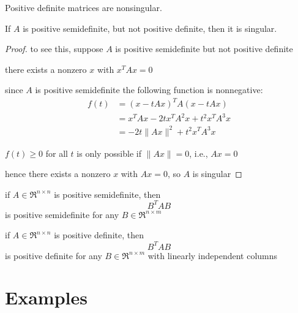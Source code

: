 \begin{theorem}
    Positive definite matrices are nonsingular.
\end{theorem}

\begin{theorem}
    If $A$ is positive semidefinite, but not positive definite, then it is singular.
\end{theorem}

\begin{proof}
    to see this, suppose $ A $ is positive semidefinite but not positive definite

    there exists a nonzero $ x $ with $ x^{T} A x=0 $


since $ A $ is positive semidefinite the following function is nonnegative:
\begin{equation}
\begin{aligned}
f(t) &=(x-t A x)^{T} A(x-t A x) \\
&=x^{T} A x-2 t x^{T} A^{2} x+t^{2} x^{T} A^{3} x \\
&=-2 t\|A x\|^{2}+t^{2} x^{T} A^{3} x
\end{aligned}
\end{equation}

$ f(t) \geq 0 $ for all $ t $ is only possible if $ \|A x\|=0 $, i.e., $ A x=0 $

hence there exists a nonzero $ x $ with $ A x=0 $, so $ A $ is singular
\end{proof}

\begin{corollary}
    if $ A \in \mathfrak{R}^{n \times n} $ is positive semidefinite, then
\begin{equation}
B^{T} A B
\end{equation}
is positive semidefinite for any $ B \in \mathfrak{R}^{n \times m} $
\end{corollary}

\begin{corollary}
    if $ A \in \mathfrak{R}^{n \times n} $ is positive definite, then
\begin{equation}
B^{T} A B
\end{equation}
is positive definite for any $ B \in \mathfrak{R}^{n \times m} $ with linearly independent columns
\end{corollary}

\section{Examples}

